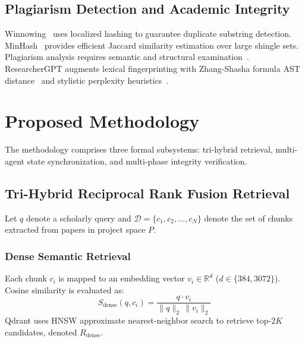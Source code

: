 \documentclass[conference]{IEEEtran}
\begin{document}
\subsection{Plagiarism Detection and Academic Integrity}
Winnowing~\cite{schleimer2003winnowing} uses localized hashing to guarantee duplicate substring detection. MinHash~\cite{broder1997minhash} provides efficient Jaccard similarity estimation over large shingle sets. Plagiarism analysis requires semantic and structural examination~\cite{foltynek2019plagiarism}. ResearcherGPT augments lexical fingerprinting with Zhang-Shasha formula AST distance~\cite{zhang1989tree} and stylistic perplexity heuristics~\cite{vaswani2017attention,devlin2019bert}.

\section{Proposed Methodology}
The methodology comprises three formal subsystems: tri-hybrid retrieval, multi-agent state synchronization, and multi-phase integrity verification.

\subsection{Tri-Hybrid Reciprocal Rank Fusion Retrieval}
Let $q$ denote a scholarly query and $\mathcal{D} = \{c_1, c_2, \ldots, c_N\}$ denote the set of chunks extracted from papers in project space $P$.

\subsubsection{Dense Semantic Retrieval}
Each chunk $c_i$ is mapped to an embedding vector $v_i \in \mathbb{R}^d$ ($d \in \{384, 3072\}$). Cosine similarity is evaluated as:
\begin{equation}
S_{\mathrm{dense}}(q, c_i) = \frac{q \cdot v_i}{\|q\|_2 \, \|v_i\|_2}
\label{eq:cosine}
\end{equation}
Qdrant uses HNSW approximate nearest-neighbor search to retrieve top-$2K$ candidates, denoted $R_{\mathrm{dense}}$.
\end{document}
